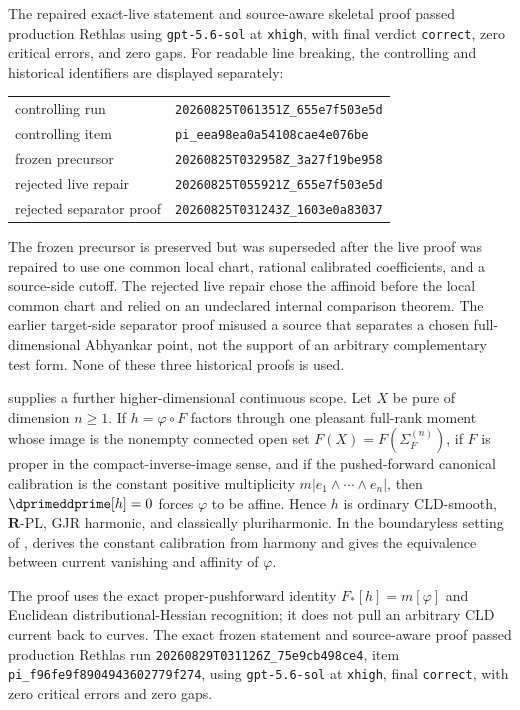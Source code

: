The repaired exact-live statement and source-aware skeletal proof passed
production Rethlas using \texttt{gpt-5.6-sol} at \texttt{xhigh}, with final
verdict \texttt{correct}, zero critical errors, and zero gaps.  For readable
line breaking, the controlling and historical identifiers are displayed
separately:
\begin{center}
\small
\begin{tabular}{@{}ll@{}}
controlling run & \nolinkurl{20260825T061351Z_655e7f503e5d}\tabularnewline
controlling item & \nolinkurl{pi_eea98ea0a54108cae4e076be}\tabularnewline
frozen precursor & \nolinkurl{20260825T032958Z_3a27f19be958}\tabularnewline
rejected live repair & \nolinkurl{20260825T055921Z_655e7f503e5d}\tabularnewline
rejected separator proof & \nolinkurl{20260825T031243Z_1603e0a83037}
\end{tabular}
\end{center}
The frozen precursor is preserved but was superseded after the live proof was
repaired to use one common local chart, rational calibrated coefficients, and
a source-side cutoff.  The rejected live repair chose the affinoid before the
local common chart and relied on an undeclared internal comparison theorem.
The earlier target-side separator proof misused a source that separates a
chosen full-dimensional Abhyankar point, not the support of an arbitrary
complementary test form.  None of these three historical proofs is used.

 supplies a further
higher-dimensional continuous scope.  Let $X$ be pure of dimension
$n\geq 1$.  If $h=\varphi\circ F$ factors through one pleasant full-rank
moment whose image is the nonempty connected open set
$F(X)=F(\Sigma_F^{(n)})$, if $F$ is proper in the compact-inverse-image
sense, and if the pushed-forward canonical calibration is the constant
positive multiplicity $m|e_1\wedge\cdots\wedge e_n|$, then
$\dprimeddprime[h]=0$ forces $\varphi$ to be affine.  Hence $h$ is ordinary
CLD-smooth, $\mathbf R$-PL, GJR harmonic, and classically pluriharmonic.  In
the boundaryless setting of ,
 derives the
constant calibration from harmony and gives the equivalence between current
vanishing and affinity of $\varphi$.

The proof uses the exact proper-pushforward identity
$F_*[h]=m[\varphi]$ and Euclidean distributional-Hessian recognition; it does
not pull an arbitrary CLD current back to curves.  The exact frozen statement
and source-aware proof passed production Rethlas run
\nolinkurl{20260829T031126Z_75e9cb498ce4}, item
\nolinkurl{pi_f96fe9f8904943602779f274}, using
\texttt{gpt-5.6-sol} at \texttt{xhigh}, final \texttt{correct}, with zero
critical errors and zero gaps.

